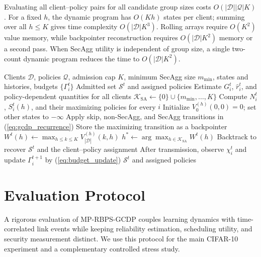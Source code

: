 \documentclass[preprint,12pt]{elsarticle}
\begin{document}
Evaluating all client--policy pairs for all candidate group sizes costs \(O(|\mathcal D||\mathcal Q|K)\). For a fixed \(h\), the dynamic program has \(O(Kh)\) states per client; summing over all \(h\leq K\) gives time complexity \(O(|\mathcal D|K^3)\). Rolling arrays require \(O(K^2)\) value memory, while backpointer reconstruction requires \(O(|\mathcal D|K^2)\) memory or a second pass. When SecAgg utility is independent of group size, a single two-count dynamic program reduces the time to \(O(|\mathcal D|K^2)\).

\begin{algorithm}[t]
	\caption{MP-RBPS with Group-Cardinality Dynamic Programming}
	\label{alg:mprbps}
	\begin{algorithmic}[1]
		\REQUIRE Clients \(\mathcal D\), policies \(\mathcal Q\), admission cap \(K\), minimum SecAgg size \(m_{\min}\), states and histories, budgets \(\{\Gamma_i^t\}\)
		\ENSURE Admitted set \(\mathcal S^t\) and assigned policies
		\STATE Estimate \(G_i^t\), \(\hat r_i^t\), and policy-dependent quantities for all clients
		\STATE \(\mathcal K_{\mathrm{SA}}\leftarrow\{0\}\cup\{m_{\min},\ldots,K\}\)
			\STATE Compute \(N_i^t\), \(S_i^t(h)\), and their maximizing policies for every \(i\)
			\STATE Initialize \(V_0^{(h)}(0,0)=0\); set other states to \(-\infty\)
					\STATE Apply skip, non-SecAgg, and SecAgg transitions in (\ref{eq:gcdp_recurrence})
					\STATE Store the maximizing transition as a backpointer
				\ENDFOR
			\ENDFOR
			\STATE \(W^t(h)\leftarrow\max_{h\leq k\leq K}V_{|\mathcal D|}^{(h)}(k,h)\)
		\ENDFOR
		\STATE \(h^*\leftarrow\arg\max_{h\in\mathcal K_{\mathrm{SA}}}W^t(h)\)
		\STATE Backtrack to recover \(\mathcal S^t\) and the client--policy assignment
		\STATE After transmission, observe \(\chi_i^t\) and update \(\Gamma_i^{t+1}\) by (\ref{eq:budget_update})
		\RETURN \(\mathcal S^t\) and assigned policies
	\end{algorithmic}
\end{algorithm}

\section{Evaluation Protocol}
\label{sec:evaluation_protocol}

A rigorous evaluation of MP-RBPS-GCDP couples learning dynamics with time-correlated link events while keeping reliability estimation, scheduling utility, and security measurement distinct. We use this protocol for the main CIFAR-10 experiment and a complementary controlled stress study.
\end{document}
